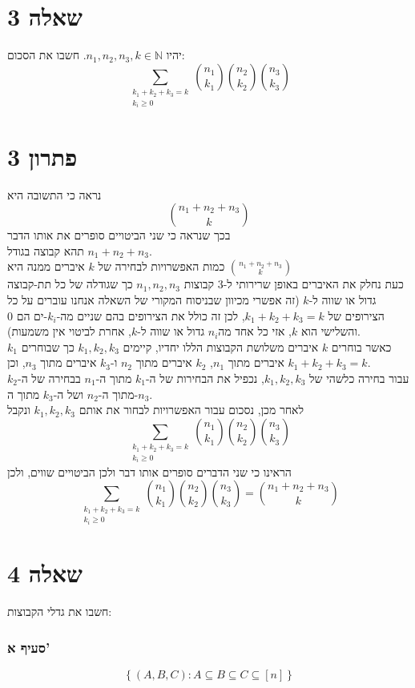 \documentclass[12pt, titlepage]{article}
\begin{document}
\part*{שאלה 3}
יהיו $n_1,n_2,n_3,k \in \mathbb{N}$. חשבו את הסכום:
\[
    \sum_{\begin{gathered}k_1+k_2+k_3=k\\k_i \geq 0 \end{gathered}} \binom{n_1}{k_1}\binom{n_2}{k_2}\binom{n_3}{k_3}
\]
\part*{פתרון 3}
נראה כי התשובה היא
\[
    \binom{n_1+n_2+n_3}{k}
\]
בכך שנראה כי שני הביטויים סופרים את אותו הדבר\\
תהא קבוצה בגודל $n_1+n_2+n_3$.\\
כמות האפשרויות לבחירה של $k$ איברים ממנה היא $\binom{n_1+n_2+n_3}{k}$\\
כעת נחלק את האיברים באופן שרירותי ל-$3$ קבוצות $n_1,n_2,n_3$ כך שגודלה של כל תת-קבוצה גדול או שווה ל-$k$ (זה אפשרי מכיוון שבניסוח המקורי של השאלה אנחנו עוברים על כל הצירופים של $k_1+k_2+k_3=k$, לכן זה כולל את הצירופים בהם שניים מה-$k_i$-ים הם $0$ והשלישי הוא $k$, אזי כל אחד מה$n_i$ גדול או שווה ל-$k$, אחרת לביטוי אין משמעות).\\
כאשר בוחרים $k$ איברים משלושת הקבוצות הללו יחדיו, קיימים $k_1,k_2,k_3$ כך שבוחרים $k_1$ איברים מתוך $n_1$, $k_2$ איברים מתוך $n_2$ ו-$k_3$ איברים מתוך $n_3$, וכן $k_1+k_2+k_3=k$.\\
עבור בחירה כלשהי של $k_1,k_2,k_3$, נכפיל את הבחירות של ה-$k_1$ מתוך ה-$n_1$ בבחירה של ה-$k_2$ מתוך ה-$n_2$ ושל ה-$k_3$ מתוך ה-$n_3$.\\
לאחר מכן, נסכום עבור האפשרויות לבחור את אותם $k_1,k_2,k_3$ ונקבל
\[
    \sum_{\begin{gathered}k_1+k_2+k_3=k\\k_i \geq 0 \end{gathered}} \binom{n_1}{k_1}\binom{n_2}{k_2}\binom{n_3}{k_3}
    \]
הראינו כי שני הדברים סופרים אותו דבר ולכן הביטויים שווים, ולכן
\[
    \boxed{\sum_{\begin{gathered}k_1+k_2+k_3=k\\k_i \geq 0 \end{gathered}} \binom{n_1}{k_1}\binom{n_2}{k_2}\binom{n_3}{k_3} = \binom{n_1+n_2+n_3}{k}}
\]
\newpage
\part*{שאלה 4}
חשבו את גדלי הקבוצות:
\section*{סעיף א'}
\[
    \left\{\left(A,B,C\right):A\subseteq B \subseteq C \subseteq \left[n\right] \right\}
\]
\end{document}
